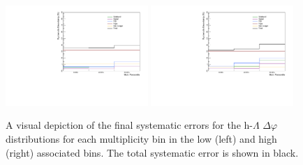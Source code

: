 \begin{figure}[ht]
    \centering
    \includegraphics[width=0.48\textwidth]{figures/analysis/systematics_dphi_postbarlow_lowpt.pdf}
    \includegraphics[width=0.48\textwidth]{figures/analysis/systematics_dphi_postbarlow_highpt.pdf}
    \caption{A visual depiction of the final systematic errors for the h-$\Lambda$ $\Delta\varphi$ distributions for each multiplicity bin in the low (left) and high (right) associated \pt bins. The total systematic error is shown in black.}
    \label{fig:dphi_systematics_plots}
\end{figure}

